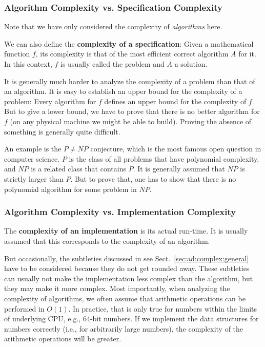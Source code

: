 \subsubsection{Algorithm Complexity vs. Specification Complexity}

Note that we have only considered the complexity of \emph{algorithms} here.

We can also define the \textbf{complexity of a specification}: Given a mathematical function $f$, its complexity is that of the most efficient correct algorithm $A$ for it.
In this context, $f$ is usually called the problem and $A$ a solution.

It is generally much harder to analyze the complexity of a problem than that of an algorithm.
It is easy to establish an upper bound for the complexity of a problem: Every algorithm for $f$ defines an upper bound for the complexity of $f$.
But to give a lower bound, we have to prove that there is no better algorithm for $f$ (on any physical machine we might be able to build).
Proving the absence of something is generally quite difficult.

An example is the $P\neq NP$ conjecture, which is the most famous open question in computer science.
$P$ is the class of all problems that have polynomial complexity, and $NP$ is a related class that contains $P$.
It is generally assumed that $NP$ is strictly larger than $P$.
But to prove that, one has to show that there is no polynomial algorithm for some problem in $NP$.

\subsubsection{Algorithm Complexity vs. Implementation Complexity}

The \textbf{complexity of an implementation} is its actual run-time.
It is usually assumed that this corresponds to the complexity of an algorithm.

But occasionally, the subtleties discussed in see Sect.~\ref{sec:ad:complex:general} have to be considered because they do not get rounded away.
These subtleties can usually not make the implementation less complex than the algorithm, but they may make it more complex.
Most importantly, when analyzing the complexity of algorithms, we often assume that arithmetic operations can be performed in $O(1)$.
In practice, that is only true for numbers within the limits of underlying CPU, e.g., $64$-bit numbers.
If we implement the data structures for numbers correctly (i.e., for arbitrarily large numbers), the complexity of the arithmetic operations will be greater.

